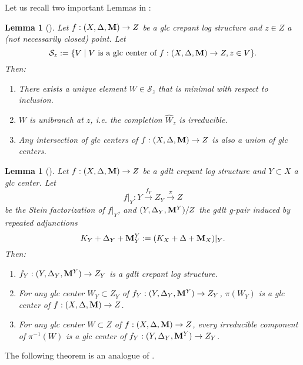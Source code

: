 \documentclass[11pt]{amsart}
\numberwithin{equation}{section}
\newcommand{\Mm}{{\bf{M}}}
\newtheorem{lem}[thm]{Lemma}
\theoremstyle{definition}
\theoremstyle{definition}
\theoremstyle{definition}
\begin{document}
Let us recall two important Lemmas in \cite{LX22b}:

\begin{lem}[{\cite[Lemma 3.17]{LX22b}}]\label{lem: glc locus is unibranch}
Let $f: (X,\Delta,\Mm)\rightarrow Z$ be a glc crepant log structure and $z\in Z$ a (not necessarily closed) point. Let $$\mathcal{S}_z:=\{V\mid V\text{ is a glc center of }f: (X,\Delta,\Mm)\rightarrow Z, z\in V\}.$$
Then:
\begin{enumerate}
    \item There exists a unique element $W\in\mathcal{S}_z$ that is minimal with respect to inclusion. 
    \item $W$ is unibranch at $z$, i.e.  the completion $\hat{W}_z$ is irreducible.
    \item Any intersection of glc centers of $f: (X,\Delta,\Mm)\rightarrow Z$ is also a union of glc centers.
\end{enumerate}
\end{lem}

\begin{lem}[{\cite[Lemma 3.19]{LX22b}}]\label{lem: gdlt crepant log structure is compatible under subadjunction}
Let $f: (X,\Delta,\Mm)\to Z$ be a gdlt crepant log structure and $Y\subset X$ a glc center. Let
$$
f|_Y: Y\xrightarrow{f_Y}Z_Y\xrightarrow{\pi} Z
$$
be the Stein factorization of $f|_Y$, and $(Y,\Delta_Y,\Mm^Y)/Z$ the gdlt g-pair induced by repeated adjunctions
$$K_Y+\Delta_Y+\Mm_Y^Y:=(K_X+\Delta+\Mm_X)|_Y.$$
Then:
\begin{enumerate}
\item $f_Y: (Y,\Delta_Y,\Mm^Y)\rightarrow Z_Y$ is a gdlt crepant log structure.
\item For any glc center $W_Y\subset Z_Y$ of $f_Y: (Y,\Delta_Y,\Mm^Y)\rightarrow Z_Y$, $\pi(W_Y)$ is a glc center of $f: (X,\Delta,\Mm)\rightarrow Z$.
\item For any glc center $W\subset Z$ of $f: (X,\Delta,\Mm)\rightarrow Z$, every irreducible component of $\pi^{-1}(W)$ is a glc center of  $f_Y: (Y,\Delta_Y,\Mm^Y)\rightarrow Z_Y$.
\end{enumerate}
\end{lem}







The following theorem is an analogue of \cite[Theorem-Definition 4.45]{Kol13}.
\end{document}
